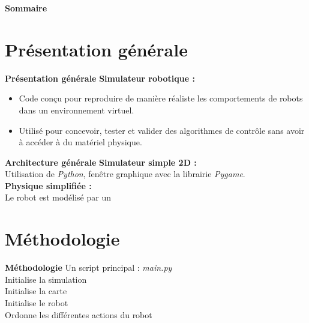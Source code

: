 \documentclass[aspectratio=169,10pt]{beamer}
\title[Titre court]{\titre}
\subtitle{\soustitre}
\author{\auteur}
\institute{\institut}
\date{\today}
\begin{document}
\begin{frame}
    \titlepage
\end{frame}

\begin{frame}{\textbf{Sommaire}}
    \tableofcontents
\end{frame}

\section{Présentation générale}
\begin{frame}{\textbf{Présentation générale}}
    \textbf{Simulateur robotique :}\\ 

    \begin{itemize}
        \item[] Code conçu pour reproduire de manière réaliste les comportements de robots dans un environnement virtuel.\\
        \item[] Utilisé pour concevoir, tester et valider des algorithmes de contrôle sans avoir à accéder à du matériel physique.\\
    \end{itemize}
    
\end{frame}

\begin{frame}{\textbf{Architecture générale}}
    \textbf{Simulateur simple 2D :\\}
    Utilisation de \textit{Python}, fenêtre graphique avec la librairie \textit{Pygame}.\\

    \textbf{Physique simplifiée :}\\
    

    Le robot est modélisé par un
    
\end{frame}


\section{Méthodologie}

\begin{frame}{\textbf{Méthodologie}}
    Un script principal : \textit{main.py}\\
    \hspace{1em}Initialise la simulation\\
    \hspace{2em}Initialise la carte\\
    \hspace{2em}Initialise le robot\\
    
    \hspace{1em}Ordonne les différentes actions du robot

\end{frame}
\end{document}
